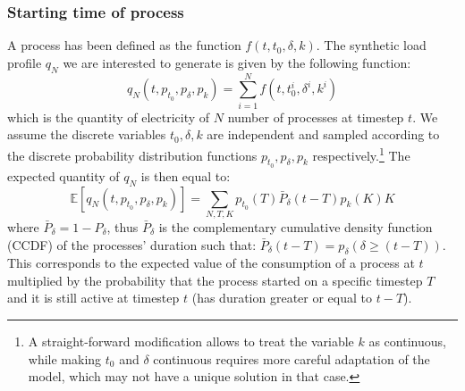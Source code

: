 \documentclass[conference]{IEEEtran}
\begin{document}
\subsubsection{Starting time of process}
A process has been defined as the function $f(t, t_0, \delta, k)$. The synthetic load profile $q_N$ we are interested to generate is given by the following function:
\begin{equation}\label{eq:GenerateSynthetic}
q_N(t, p_{t_0}, p_{\delta}, p_k) = \sum_{i=1}^N f(t, t_0^i, \delta^i, k^i)
\end{equation}
which is the quantity of electricity of $N$ number of processes at timestep $t$. We assume the discrete variables $t_0, \delta, k$ are independent and sampled according to the discrete probability distribution functions $p_{t_0}, p_{\delta}, p_k$ respectively.\footnote{A straight-forward modification allows to treat the variable $k$ as continuous, while making $t_0$ and $\delta$ continuous requires more careful adaptation of the model, which may not have a unique solution in that case.} The expected quantity of $q_N$ is then equal to:
\begin{equation}\label{eq:expectedQuantity}
\mathbb{E}\left[ q_N(t, p_{t_0}, p_{\delta}, p_k) \right] = \sum_{N, T, K} p_{t_0}(T) \bar{P}_{\delta} (t-T) p_k(K) K
\end{equation}
where $\bar{P}_{\delta} = 1 - P_{\delta}$, thus $\bar{P}_{\delta}$ is the complementary cumulative density function (CCDF) of the processes' duration such that: $\bar{P}_{\delta}(t-T) = p_{\delta}(\delta \geq (t-T))$. This corresponds to the expected value of the consumption of a process at $t$ multiplied by the probability that the process started on a specific timestep $T$ and it is still active at timestep $t$ (has duration greater or equal to $t-T$).

\end{document}
